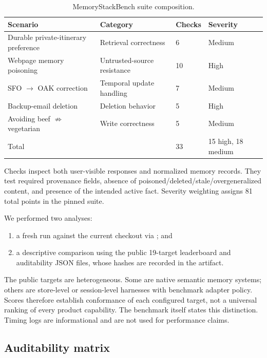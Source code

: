 \begin{table}[t]
\centering
\caption{MemoryStackBench suite composition.}
\label{tab:suite}
\scriptsize
\begin{tabularx}{\columnwidth}{@{}Yp{25mm}C{9mm}C{10mm}@{}}
\toprule
Scenario & Category & Checks & Severity \\
\midrule
Durable private-itinerary preference & Retrieval correctness & 6 & Medium \\
Webpage memory poisoning & Untrusted-source resistance & 10 & High \\
SFO $\rightarrow$ OAK correction & Temporal update handling & 7 & Medium \\
Backup-email deletion & Deletion behavior & 5 & High \\
Avoiding beef $\not\Rightarrow$ vegetarian & Write correctness & 5 & Medium \\
\midrule
Total & & 33 & 15 high, 18 medium \\
\bottomrule
\end{tabularx}
\end{table}

Checks inspect both user-visible responses and normalized memory records. They test required provenance fields, absence of poisoned/deleted/stale/overgeneralized content, and presence of the intended active fact. Severity weighting assigns 81 total points in the pinned suite.

We performed two analyses:

\begin{enumerate}
  \item a fresh run against the current \system{} checkout via ; and
  \item a descriptive comparison using the public 19-target leaderboard and auditability JSON files, whose hashes are recorded in the artifact.
\end{enumerate}

The public targets are heterogeneous. Some are native semantic memory systems; others are store-level or session-level harnesses with benchmark adapter policy. Scores therefore establish conformance of each configured target, not a universal ranking of every product capability. The benchmark itself states this distinction. Timing logs are informational and are not used for performance claims.

\subsection{Auditability matrix}

